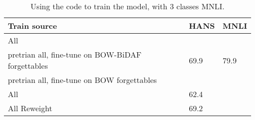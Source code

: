 \begin{table}[h]
    \centering
    \begin{tabular}{l | l l}
        Train source & HANS & MNLI \\
        \hline
        All &  & \\
        \hline
        pretrian all, fine-tune on BOW-BiDAF forgettables & 69.9 & 79.9\\
        pretrian all, fine-tune on BOW forgettables & \\
        \hline 
        All \citep{clark2019dont} & 62.4 & \\
        All Reweight \citep{clark2019dont} & 69.2 \\
        
    \end{tabular}
    \caption{Using the \cite{clark2019dont} code to train the model, with 3 classes MNLI. }
    \label{tab:threeclass}
\end{table}
\fi



